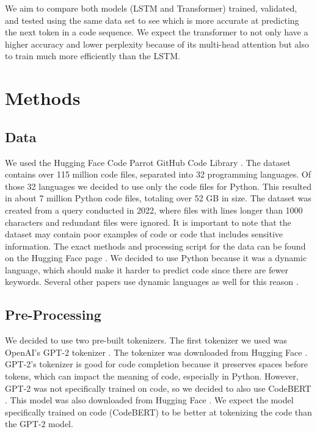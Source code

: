 \documentclass[11pt]{article}
\begin{document}
We aim to compare both models (LSTM and Transformer) trained, validated, and tested using the same data set to see which is more accurate at predicting the next token in a code sequence. We expect the transformer to not only have a higher accuracy and lower perplexity because of its multi-head attention but also to train much more efficiently than the LSTM.

\section{Methods}

\subsection{Data}
We used the Hugging Face Code Parrot GitHub Code Library \cite{data}. The dataset contains over 115 million code files, separated into 32 programming languages. Of those 32 languages we decided to use only the code files for Python. This resulted in about 7 million Python code files, totaling over 52 GB in size. The dataset was created from a query conducted in 2022, where files with lines longer than 1000 characters and redundant files were ignored. It is important to note that the dataset may contain poor examples of code or code that includes sensitive information. The exact methods and processing script for the data can be found on the Hugging Face page \cite{data}.  We decided to use Python because it was a dynamic language, which should make it harder to predict code since there are fewer keywords. Several other papers use dynamic languages as well for this reason \cite{stanford}\cite{microsoft}. 

\subsection{Pre-Processing}
We decided to use two pre-built tokenizers. The first tokenizer we used was OpenAI's GPT-2 tokenizer \cite{gpt}. The tokenizer was downloaded from Hugging Face \cite{huggingface_gpt}. GPT-2's tokenizer is good for code completion because it preserves spaces before tokens, which can impact the meaning of code, especially in Python. However, GPT-2 was not specifically trained on code, so we decided to also use CodeBERT \cite{codebert}. This model was also downloaded from Hugging Face \cite{huggingface_codebert}. We expect the model specifically trained on code (CodeBERT) to be better at tokenizing the code than the GPT-2 model.
\end{document}
